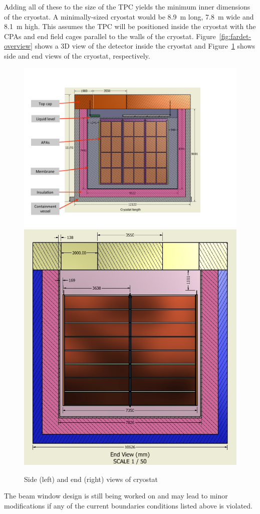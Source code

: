 Adding all of these to the size of the TPC yields the minimum inner dimensions of the cryostat.  A 
minimally-sized cryostat would be 8.9~m long, 7.8~m wide and 8.1~m high.  This assumes the TPC will be 
positioned inside the cryostat with the CPAs and end field cages parallel to the walls of the cryostat. 
Figure~\ref{fig:fardet-overview} shows a 3D view of the detector inside the cryostat and Figure~\ref{fig:cryostat-views} shows side and end views of the cryostat, respectively. 
%
\begin{figure}
\begin{center}
\includegraphics[width=.53\textwidth]{figures/cryostat-side-view} 
\includegraphics[width=.455\textwidth]{figures/cryostat-westend-view}  
\caption[Views of cryostat]{Side (left) and end (right) views of cryostat}
\label{fig:cryostat-views} 
\end{center}
\end{figure}
%
The beam window design is still being worked on and may lead to minor modifications if
any of the current boundaries conditions listed above is violated.
  
